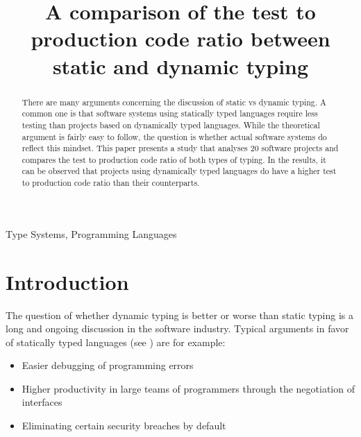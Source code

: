\documentclass[conference]{IEEEtran}
\begin{document}
\title{A comparison of the test to production code ratio between static and dynamic typing}

\author{
}

\maketitle

\begin{abstract}
There are many arguments concerning the discussion of static vs dynamic typing. A common one is that software systems using statically typed languages require less testing than projects based on dynamically typed languages. While the theoretical argument is fairly easy to follow, the question is whether actual software systems do reflect this mindset. This paper presents a study that analyses 20 software projects and compares the test to production code ratio of both types of typing. In the results, it can be observed that projects using dynamically typed languages do have a higher test to production code ratio than their counterparts.
\end{abstract}

\begin{IEEEkeywords}
Type Systems, Programming Languages
\end{IEEEkeywords}

\section{Introduction}

The question of whether dynamic typing is better or worse than static typing is a long and ongoing discussion in the software industry. Typical arguments in favor of statically typed languages (see \cite{cardelli_luca_type_systems}) are for example:

\begin{itemize}
    \item Easier debugging of programming errors
    \item Higher productivity in large teams of programmers through the negotiation of interfaces
    \item Eliminating certain security breaches by default
\end{itemize}
\end{document}
